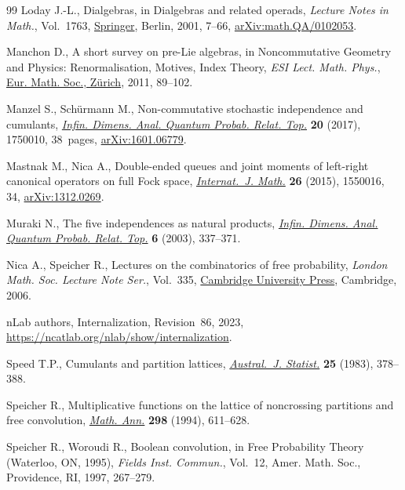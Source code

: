 \documentclass[pdftex]{sigma}
\numberwithin{equation}{section}
\begin{document}
\begin{thebibliography}{99}
Loday J.-L., Dialgebras, in Dialgebras and related operads, \textit{Lecture
 Notes in Math.}, Vol.~1763, \href{https://doi.org/10.1007/3-540-45328-8_2}{Springer}, Berlin, 2001, 7--66,
 \href{https://arxiv.org/abs/math.QA/0102053}{arXiv:math.QA/0102053}.

Manchon D., A short survey on pre-{L}ie algebras, in Noncommutative Geometry
 and Physics: Renormalisation, Motives, Index Theory, \textit{ESI Lect. Math. Phys.},
 \href{https://doi.org/10.4171/008-1/3}{Eur. Math. Soc., Z\"urich}, 2011, 89--102.

Manzel S., Sch\"urmann M., Non-commutative stochastic independence and
 cumulants, \href{https://doi.org/10.1142/S0219025717500102}{\textit{Infin. Dimens. Anal. Quantum Probab. Relat. Top.}}
 \textbf{20} (2017), 1750010, 38~pages, \href{https://arxiv.org/abs/1601.06779}{arXiv:1601.06779}.

Mastnak M., Nica A., Double-ended queues and joint moments of left-right
 canonical operators on full {F}ock space, \href{https://doi.org/10.1142/S0129167X15500160}{\textit{Internat.~J. Math.}}
 \textbf{26} (2015), 1550016, 34, \href{https://arxiv.org/abs/1312.0269}{arXiv:1312.0269}.

Muraki N., The five independences as natural products, \href{https://doi.org/10.1142/S0219025703001365}{\textit{Infin. Dimens.
 Anal. Quantum Probab. Relat. Top.}} \textbf{6} (2003), 337--371.

Nica A., Speicher R., Lectures on the combinatorics of free probability,
 \textit{London Math. Soc. Lecture Note Ser.}, Vol.~335, \href{https://doi.org/10.1017/CBO9780511735127}{Cambridge University
 Press}, Cambridge, 2006.

 nLab authors, Internalization, Revision~86, 2023, \url{https://ncatlab.org/nlab/show/internalization}.

Speed T.P., Cumulants and partition lattices, \href{https://doi.org/10.1111/j.1467-842X.1983.tb00391.x}{\textit{Austral.~J. Statist.}}
 \textbf{25} (1983), 378--388.

Speicher R., Multiplicative functions on the lattice of noncrossing partitions
 and free convolution, \href{https://doi.org/10.1007/BF01459754}{\textit{Math. Ann.}} \textbf{298} (1994), 611--628.

Speicher R., Woroudi R., Boolean convolution, in Free Probability Theory
 ({W}aterloo, {ON}, 1995), \textit{Fields Inst. Commun.}, Vol.~12, Amer. Math.
 Soc., Providence, RI, 1997, 267--279.


\end{thebibliography}
\end{document}
